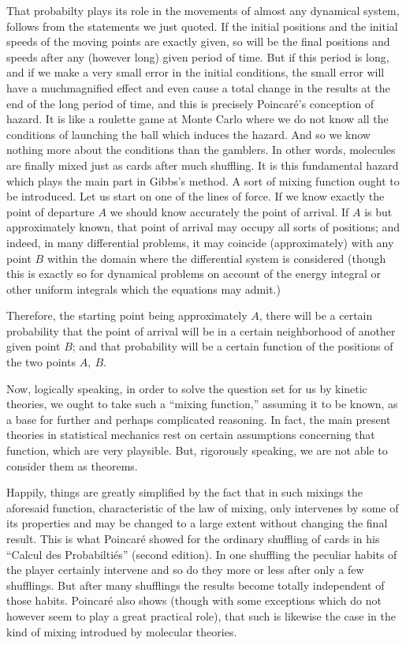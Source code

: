 \documentclass[12pt,oneside]{book}
\begin{document}
That probabilty plays its role in the movements of almost any dynamical system, follows from the statements we just quoted. If the initial positions and the initial speeds of the moving points are exactly given, so will be the final positions and speeds after any (however long) given period of time. But if this period is long, and if we make a very small error in the initial conditions, the small error will have a muchmagnified effect and even cause a total change in the results at the end of the long period of time, and this is precisely Poincar\'e's conception of hazard. It is like a roulette game at Monte Carlo where we do not know all the conditions of launching the ball which induces the hazard. And so we know nothing more about the conditions than the gamblers. In other words, molecules are finally mixed just as cards after much shuffling. It is this fundamental hazard which plays the main part in Gibbs's method. A sort of mixing function ought to be introduced. Let us start on one of the lines of force. If we know exactly the point of departure $A$ we should know accurately the point of arrival. If $A$ is but approximately known, that point of arrival may occupy all sorts of positions; and indeed, in many differential problems, it may coincide (approximately) with any point $B$ within the domain where the differential system is considered (though this is exactly so for dynamical problems on account of the energy integral or other uniform integrals which the equations may admit.) \par 

Therefore, the starting point being approximately $A$, there will be a certain probability that the point of arrival will be in a certain neighborhood of another given point $B$; and that probability will be a certain function of the positions of the two points $A,\ B$. \par 

Now, logically speaking, in order to solve the question set for us by kinetic theories, we ought to take such a ``mixing function,'' assuming it to be known, as a base for further and perhaps complicated reasoning. In fact, the main present theories in statistical mechanics rest on certain assumptions concerning that function, which are very playsible. But, rigorously speaking, we are not able to consider them as theorems. \par 

Happily, things are greatly simplified by the fact that in such mixings the aforesaid function, characteristic of the law of mixing, only intervenes by some of its properties and may be changed to a large extent without changing the final result. This is what Poincar\'e showed for the ordinary shuffling of cards in his ``Calcul des Probabilti\'es'' (second edition). In one shuffling the peculiar habits of the player certainly intervene and so do they more or less after only a few shufflings. But after many shufflings the results become totally independent of those habits. Poincar\'e also shows (though with some exceptions which do not however seem to play a great practical role), that such is likewise the case in the kind of mixing introdued by molecular theories. \par 
\end{document}
